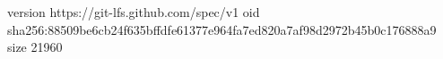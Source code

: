 version https://git-lfs.github.com/spec/v1
oid sha256:88509be6cb24f635bffdfe61377e964fa7ed820a7af98d2972b45b0c176888a9
size 21960
